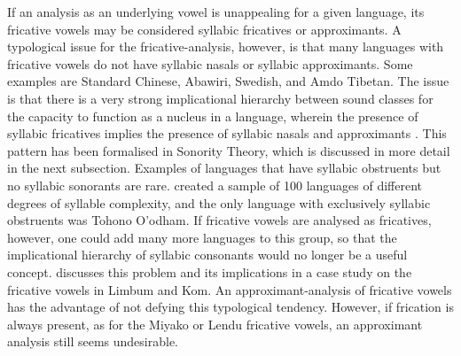 \documentclass[output=paper,colorlinks,citecolor=brown,chinesefont]{langscibook}
\begin{document}
If an analysis as an underlying vowel is unappealing for a given language, its fricative vowels may be considered syllabic fricatives or approximants. A typological issue for the fricative-analysis, however, is that many languages with fricative vowels do not have syllabic nasals or syllabic approximants. Some examples are Standard Chinese, Abawiri, Swedish, and Amdo Tibetan. The issue is that there is a very strong implicational hierarchy between sound classes for the capacity to function as a nucleus in a language, wherein the presence of syllabic fricatives implies the presence of syllabic nasals and approximants \citep[294]{Clements_1990}. This pattern has been formalised in Sonority Theory, which is discussed in more detail in the next subsection. Examples of languages that have syllabic obstruents but no syllabic sonorants are rare. \citet{Easterday_2019} created a sample of 100 languages of different degrees of syllable complexity, and the only language with exclusively syllabic obstruents was Tohono O'odham. If fricative vowels are analysed as fricatives, however, one could add many more languages to this group, so that the implicational hierarchy of syllabic consonants would no longer be a useful concept. \citet{Faytak_2017} discusses this problem and its implications in a case study on the fricative vowels in Limbum and Kom. An approximant-analysis of fricative vowels has the advantage of not defying this typological tendency. However, if frication is always present, as for the Miyako or Lendu fricative vowels, an approximant analysis still seems undesirable.
\end{document}
